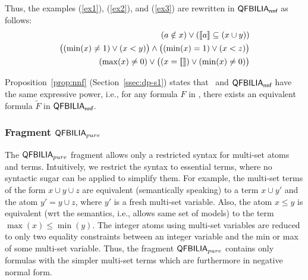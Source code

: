 Thus, the examples (\ref{ex1}), (\ref{ex2}), and (\ref{ex3}) are rewritten in $\textsf{QFBILIA}_{\textsf{nnf}}$ as follows:
\begin{eqnarray}
\label{ex2}
(a \notin x) \lor (\llbracket a \rrbracket \subseteq (x\cup y))
\label{ex1nnf}
\\
\big((\min(x) \neq 1) \lor (x<y)\big) \land \big((\min(x) = 1) \lor (x < z)\big)
\label{ex2nnf}
\\
(\max(x) \neq 0) \lor \big((x = \llbracket  \rrbracket) \lor (\min(x) \neq 0)\big)
\label{ex3nnf}
\end{eqnarray}



Proposition~\ref{prop:nnf} (Section~\ref{ssec:dp-s1}) states that \QFBILIA\ and $\textsf{QFBILIA}_{\textsf{nnf}}$ have the same expressive power, i.e., for any formula $F$ in \QFBILIA, there exists an equivalent formula $\tilde{F}$ in $\textsf{QFBILIA}_{\textsf{nnf}}$.


\subsubsection{Fragment $\textsf{QFBILIA}_{pure}$}
\label{sssec:pure}

The $\textsf{QFBILIA}_{pure}$ fragment allows only a restricted syntax for multi-set atoms and terms.
Intuitively, we restrict the syntax to essential terms, where no syntactic sugar can be applied to simplify them.
For example, the multi-set terms of the form $x\cup y \cup z$ are equivalent (semantically speaking)
to a term $x\cup y'$ and the atom $y'=y\cup z$, where $y'$ is a fresh multi-set variable.
Also, the atom $x\leq y$ is equivalent (wrt the semantics, i.e., allows same set of models) to the term $\max(x)\leq \min(y)$.
The integer atoms using multi-set variables are reduced to only two equality constraints between an integer variable and the min or max of some multi-set variable.
Thus, the fragment $\textsf{QFBILIA}_{pure}$ contains only formulas with the simpler multi-set terms which are furthermore in negative normal form.

